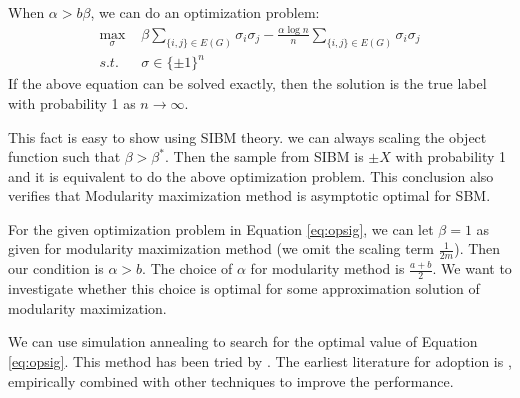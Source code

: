 \documentclass{ctexart}
\begin{document}
	When $\alpha > b \beta$, we can do an optimization problem:
	\begin{align}\label{eq:opsig}
	\max_{\sigma} \,\,& \beta \sum_{\{i,j\} \in E(G)} \sigma_i \sigma_j - \frac{\alpha \log n}{n} \sum_{\{i,j\} \in E(G)} \sigma_i \sigma_j\\
	s.t. \,\, & \sigma \in \{\pm 1\}^n
	\end{align}
	If the above equation can be solved exactly, then the solution is the true label with probability 1 as $n\to \infty$.
	
	This fact is easy to show using SIBM theory. we can always scaling the object function such that $\beta > \beta^*$.
	Then the sample from SIBM is $\pm X$ with probability 1 and it is equivalent to do the above optimization problem.
	This conclusion also verifies that Modularity maximization method is asymptotic optimal for SBM.
	
	For the given optimization problem in Equation \eqref{eq:opsig}, we can let $\beta = 1$ as given for modularity maximization method (we omit the scaling term $\frac{1}{2m}$).
	Then our condition is $\alpha > b$. The choice of $\alpha$ for modularity method is $\frac{a+b}{2}$. We want to
	investigate whether this choice is optimal for some approximation solution of modularity maximization.
	
	We can use simulation annealing to search for the optimal value of Equation \eqref{eq:opsig}. This method has been tried
	by \cite{he2016fast}. The earliest literature for adoption is \cite{liu2010detecting}, empirically combined with other techniques to improve
	the performance.
\end{document}
